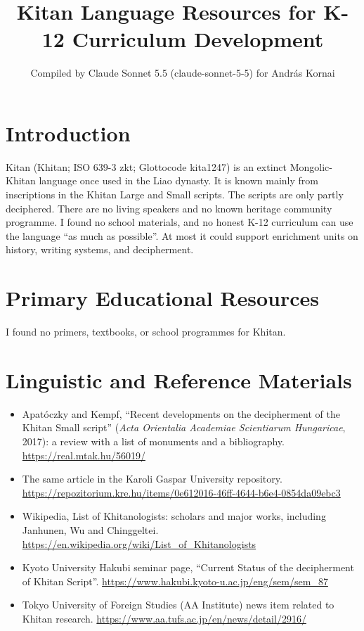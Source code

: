 \documentclass[12pt]{article}
\title{Kitan Language Resources for K-12 Curriculum Development}
\author{Compiled by Claude Sonnet 5.5 (claude-sonnet-5-5) for Andr\'as Kornai}
\date{}
\begin{document}
\maketitle

\section{Introduction}
Kitan (Khitan; ISO 639-3 zkt; Glottocode kita1247) is an extinct Mongolic-Khitan language once used in the Liao dynasty. It is known mainly from inscriptions in the Khitan Large and Small scripts. The scripts are only partly deciphered. There are no living speakers and no known heritage community programme. I found no school materials, and no honest K-12 curriculum can use the language ``as much as possible''. At most it could support enrichment units on history, writing systems, and decipherment.

\section{Primary Educational Resources}
I found no primers, textbooks, or school programmes for Khitan.

\section{Linguistic and Reference Materials}
\begin{itemize}
\item Apat\'oczky and Kempf, ``Recent developments on the decipherment of the Khitan Small script'' (\emph{Acta Orientalia Academiae Scientiarum Hungaricae}, 2017): a review with a list of monuments and a bibliography. \url{https://real.mtak.hu/56019/}
\item The same article in the Karoli Gaspar University repository. \url{https://repozitorium.kre.hu/items/0e612016-46ff-4644-b6e4-0854da09ebc3}
\item Wikipedia, List of Khitanologists: scholars and major works, including Janhunen, Wu and Chinggeltei. \url{https://en.wikipedia.org/wiki/List_of_Khitanologists}
\item Kyoto University Hakubi seminar page, ``Current Status of the decipherment of Khitan Script''. \url{https://www.hakubi.kyoto-u.ac.jp/eng/sem/sem_87}
\item Tokyo University of Foreign Studies (AA Institute) news item related to Khitan research. \url{https://www.aa.tufs.ac.jp/en/news/detail/2916/}
\end{itemize}
\end{document}
